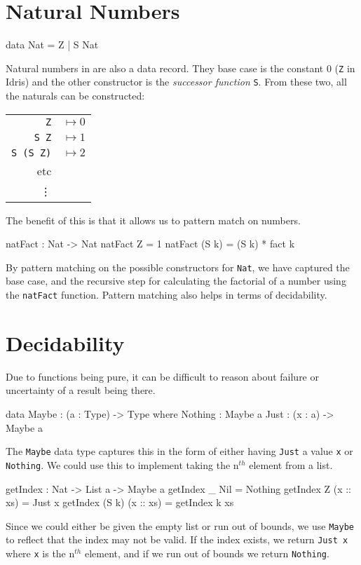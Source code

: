 \pagebreak


\section{Natural Numbers}
    \begin{code}[caption={Natural numbers as defined in the \Idris prelude}]
        data Nat = Z | S Nat
    \end{code}

    Natural numbers in \Idris are also a data record. They base case is the constant 0 (\texttt{Z} in Idris) and the other constructor is the \textit{successor function} \texttt{S}. From these two, all the naturals can be constructed:
    
    \begin{tabular}{r l}
        \texttt{Z} & $\mapsto 0$ \\ 
        \texttt{S Z} & $\mapsto 1$ \\ 
        \texttt{S (S Z)} & $\mapsto 2$ \\
        etc & \\
        \vdots & \\
    \end{tabular}
    \par
    The benefit of this is that it allows us to pattern match on numbers.
    
    \begin{code}[caption={Pattern matching on \texttt{Nat}s}]
        natFact : Nat -> Nat
        natFact Z = 1
        natFact (S k) = (S k) * fact k
    \end{code}
    By pattern matching on the possible constructors for \texttt{Nat}, we have captured the base case, and the recursive step for calculating the factorial of a number using the \texttt{natFact} function.
    Pattern matching also helps in terms of decidability.

\section{Decidability}\label{idris:dec}
    Due to functions being pure, it can be difficult to reason about failure or uncertainty of a result being there.
    \begin{code}[caption={The \texttt{Maybe} data type}]
        data Maybe : (a : Type) -> Type where
            Nothing : Maybe a
            Just : (x : a) -> Maybe a
    \end{code}
    The \texttt{Maybe} data type captures this in the form of either having \texttt{Just} a value \texttt{x} or \texttt{Nothing}. We could use this to implement taking the n$^{th}$ element from a list.
    \begin{code}[caption={List indexing using \texttt{Maybe}}]
        getIndex : Nat -> List a -> Maybe a
        getIndex _ Nil = Nothing
        getIndex Z (x :: xs) = Just x
        getIndex (S k) (x :: xs) = getIndex k xs
    \end{code}
    Since we could either be given the empty list or run out of bounds, we use \texttt{Maybe} to reflect that the index may not be valid. If the index exists, we return \texttt{Just x} where \texttt{x} is the n$^{th}$ element, and if we run out of bounds we return \texttt{Nothing}.
    
